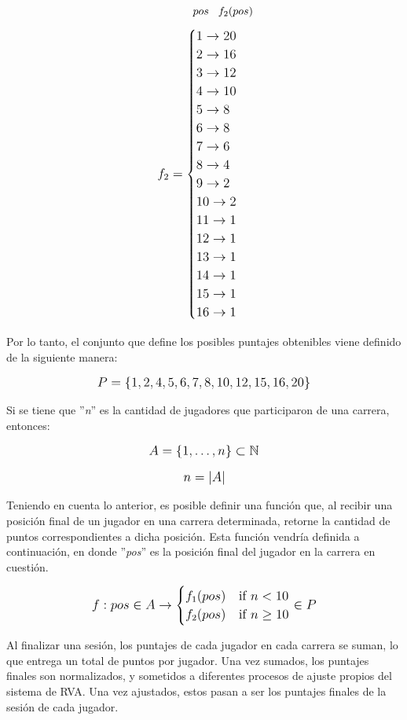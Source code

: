 \[\hspace*{1.2cm} pos \hspace*{0.3cm} f_2(pos)\]
\[
\mathlarger{
	f_2= 
	\begin{cases}
		1 \to 20 \\
		2 \to 16 \\
		3 \to 12 \\
		4 \to 10 \\
		5 \to 8 \\
		6 \to 8 \\
		7 \to 6 \\
		8 \to 4 \\
		9 \to 2 \\
		10 \to 2 \\
		11 \to 1 \\
		12 \to 1 \\
		13 \to 1 \\
		14 \to 1 \\
		15 \to 1 \\
		16 \to 1
	\end{cases}
}
\]

Por lo tanto, el conjunto que define los posibles puntajes obtenibles viene definido de la siguiente manera:

\[
\mathlarger{
	P = \{1, 2, 4, 5, 6, 7, 8, 10, 12, 15, 16, 20\}
}
\]

Si se tiene que ''\textit{n}'' es la cantidad de jugadores que participaron de una carrera, entonces:

\[
\mathlarger{
	A = \{1, \dots, n\} \subset \mathbb{N}
}
\]

\[
\mathlarger{
	n = \lvert A \rvert
}
\]

Teniendo en cuenta lo anterior, es posible definir una función que, al recibir una posición final de un jugador en una carrera determinada, retorne la cantidad de puntos correspondientes a dicha posición. Esta función vendría definida a continuación, en donde ''\textit{pos}'' es la posición final del jugador en la carrera en cuestión.

\[
\mathlarger{
f : pos \in A \to 
\begin{cases}
	f_1(pos) & \text{if } n < 10\\
	f_2(pos) & \text{if } n \geq 10
\end{cases}
\in P
}
\]

Al finalizar una sesión, los puntajes de cada jugador en cada carrera se suman, lo que entrega un total de puntos por jugador. Una vez sumados, los puntajes finales son normalizados, y sometidos a diferentes procesos de ajuste propios del sistema de RVA. Una vez ajustados, estos pasan a ser los puntajes finales de la sesión de cada jugador.

